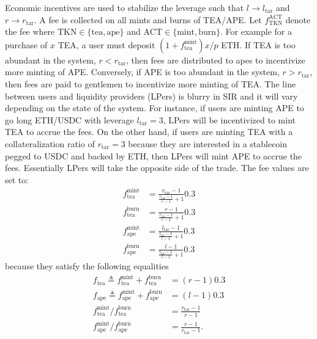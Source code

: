 \documentclass[journal,letterpaper,oneside,onecolumn,12pt]{IEEEtran}
\begin{document}
	Economic incentives are used to stabilize the leverage such that $l\rightarrow l_\textrm{tar}$ and $r\rightarrow r_\textrm{tar}$.
	A fee is collected on all mints and burns of TEA/APE. Let $f_\textrm{TKN}^\textrm{ACT}$ denote the fee where $\textrm{TKN}\in\{\textrm{tea},\textrm{ape}\}$ and $\textrm{ACT}\in\{\textrm{mint},\textrm{burn}\}$. For example for a purchase of $x$ TEA, a user must deposit $(1+f_\textrm{tea}^\textrm{mint})x/p$ ETH. If TEA is too abundant in the system, $r<r_\textrm{tar}$, then fees are distributed to apes to incentivize more minting of APE. Conversely, if APE is too abundant in the system, $r>r_\textrm{tar}$, then fees are paid to gentlemen to incentivize more minting of TEA. The line between users and liquidity providers (LPers) is blurry in SIR and it will vary depending on the state of the system. For instance, if users are minting APE to go long ETH/USDC with leverage $l_\textrm{tar}=3$, LPers will be incentivized to mint TEA to accrue the fees. On the other hand, if users are minting TEA with a collateralization ratio of $r_\textrm{tar}=3$ because they are interested in a stablecoin pegged to USDC and backed by ETH, then LPers will mint APE to accrue the fees. Essentially LPers will take the opposite side of the trade.
	The fee values are set to:
	\begin{align}
		f_\textrm{tea}^\textrm{mint} &= \frac{r_\textrm{tar}-1}{\frac{r_\textrm{tar}-1}{r-1}+1} 0.3 \label{eq:fee:tea_mint} \\
		f_\textrm{tea}^\textrm{burn} &= \frac{r-1}{\frac{r_\textrm{tar}-1}{r-1}+1} 0.3 \\
		f_\textrm{ape}^\textrm{mint} &= \frac{l_\textrm{tar}-1}{\frac{l_\textrm{tar}-1}{l-1}+1} 0.3 \\
		f_\textrm{ape}^\textrm{burn} &= \frac{l-1}{\frac{l_\textrm{tar}-1}{l-1}+1} 0.3 \label{eq:fee:ape_burn}
	\end{align}
	because they satisfy the following equalities
	\begin{align}
		f_\textrm{tea} \triangleq f_\textrm{tea}^\textrm{mint} +f_\textrm{tea}^\textrm{burn} &= (r-1)0.3 \label{eq:fee:tea} \\
		f_\textrm{ape} \triangleq f_\textrm{ape}^\textrm{mint} +f_\textrm{ape}^\textrm{burn} &= (l-1)0.3 \label{eq:fee:ape} \\
		f_\textrm{tea}^\textrm{mint}/f_\textrm{tea}^\textrm{burn} &= \frac{r_\textrm{tar}-1}{r-1} \label{eq:fee_ratio:tea} \\
		f_\textrm{ape}^\textrm{mint}/f_\textrm{ape}^\textrm{burn} &= \frac{r-1}{r_\textrm{tar}-1}. \label{eq:fee_ratio:ape}
	\end{align}
\end{document}
